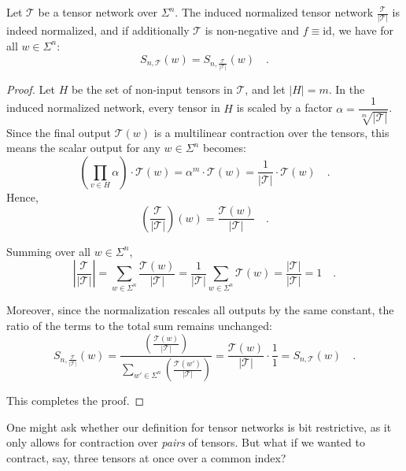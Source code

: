 \documentclass[../../main.tex]{subfiles}
\begin{document}
    \begin{lemma}
        Let $\mathcal{T}$ be a tensor network over $\Sigma^n$. The induced normalized tensor network $\frac{\mathcal{T}}{|\mathcal{T}|}$ is indeed normalized, and if additionally $\mathcal{T}$ is non-negative and $f \equiv \text{id}$, we have for all $w \in \Sigma^n$:
        \[
            S_{n, \mathcal{T}}(w) = S_{n, \frac{\mathcal{T}}{|\mathcal{T}|}}(w) \quad .
        \]
    \end{lemma}
    \pagebreak
    \begin{proof}
        Let $H$ be the set of non-input tensors in $\mathcal{T}$, and let $|H| = m$. In the induced normalized network, every tensor in $H$ is scaled by a factor $\alpha = \dfrac{1}{\sqrt[m]{|\mathcal{T}|}}$. Since the final output $\mathcal{T}(w)$ is a multilinear contraction over the tensors, this means the scalar output for any $w \in \Sigma^n$ becomes:
        \[
            \left( \prod_{v \in H} \alpha \right) \cdot \mathcal{T}(w) = \alpha^m \cdot \mathcal{T}(w) = \frac{1}{|\mathcal{T}|} \cdot \mathcal{T}(w) \quad .
        \]
        Hence,
        \[
            \left(\frac{\mathcal{T}}{|\mathcal{T}|}\right)(w) = \frac{\mathcal{T}(w)}{|\mathcal{T}|} \quad .
        \]

        Summing over all \( w \in \Sigma^n \),
        \[
            \left| \frac{\mathcal{T}}{|\mathcal{T}|} \right| = \sum_{w \in \Sigma^n} \frac{\mathcal{T}(w)}{|\mathcal{T}|} = \frac{1}{|\mathcal{T}|} \sum_{w \in \Sigma^n} \mathcal{T}(w) = \frac{|\mathcal{T}|}{|\mathcal{T}|} = 1 \quad .
        \]

        Moreover, since the normalization rescales all outputs by the same constant, the ratio of the terms to the total sum remains unchanged:
        \[
            S_{n, \frac{\mathcal{T}}{|\mathcal{T}|}}(w) = \frac{\left( \frac{\mathcal{T}(w)}{|\mathcal{T}|} \right)}{\sum_{w' \in \Sigma^n} \left( \frac{\mathcal{T}(w')}{|\mathcal{T}|} \right)} = \frac{\mathcal{T}(w)}{|\mathcal{T}|} \cdot \frac{1}{1} = S_{n, \mathcal{T}}(w) \quad .
        \]

        This completes the proof.
    \end{proof}



    One might ask whether our definition for tensor networks is bit restrictive, as it only allows for contraction over \emph{pairs} of tensors. But what if we wanted to contract, say, three tensors at once over a common index?
\end{document}
